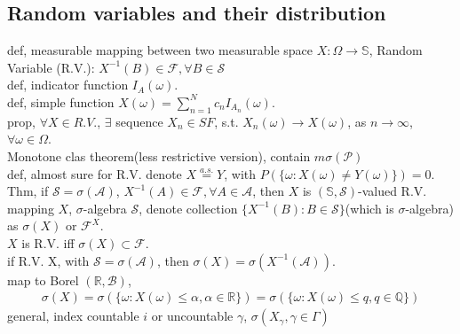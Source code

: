 \documentclass[paper=a4, fontsize=11pt]{scrartcl} %
\numberwithin{equation}{section} %
\numberwithin{figure}{section} %
\numberwithin{table}{section} %
\begin{document}
\subsection{Random variables and their distribution}
def, measurable mapping between two measurable space $X:\Omega\rightarrow \mathbb{S}$, Random Variable (R.V.): $X^{-1}(B)\in \mathcal{F},\forall B\in\mathcal{S}$\\
def, indicator function $I_A(\omega)$.\\
def, simple function $X(\omega)=\sum_{n=1}^N c_n I_{A_n}(\omega)$.\\
prop, $\forall X\in R.V.$, $\exists$ sequence $X_n\in SF$, s.t. $X_n(\omega)\rightarrow X(\omega)$, as $n\rightarrow \infty$, $\forall \omega\in \Omega$.\\
Monotone clas theorem(less restrictive version), contain $m\sigma(\mathcal{P})$\\
def, almost sure for R.V. denote $X\stackrel{a.s.}{=} Y$, with $P(\{\omega:X(\omega)\neq Y(\omega)\})=0$.\\
Thm, if $\mathcal{S}=\sigma(\mathcal{A})$, $X^{-1}(A)\in\mathcal{F},\forall A\in\mathcal{A}$, then $X$ is $(\mathbb{S},\mathcal{S})$-valued R.V.\\
mapping $X$, $\sigma$-algebra $\mathcal{S}$, denote collection $\{X^{-1}(B):B\in\mathcal{S}\}$(which is $\sigma$-algebra) as $\sigma(X)$ or $\mathcal{F}^X$.\\
$X$ is R.V. iff $\sigma(X)\subset \mathcal{F}$.\\
if R.V. X, with $\mathcal{S}=\sigma(\mathcal{A})$, then $\sigma(X)=\sigma(X^{-1}(\mathcal{A}))$.\\
map to Borel $(\mathbb{R},\mathcal{B})$,
\begin{align}
	\sigma(X) = \sigma(\{\omega:X(\omega)\leq \alpha,\alpha\in\mathbb{R}\}) = 
		\sigma(\{\omega:X(\omega)\leq q,q\in\mathbb{Q}\}) 
\end{align}
general, index countable $i$ or uncountable $\gamma$, $\sigma(X_\gamma, \gamma\in \Gamma)$
\end{document}

